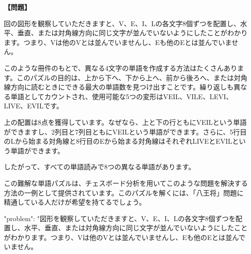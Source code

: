 \documentclass[10pt,a4paper,oneside,openany]{ltjsbook}
\begin{document}
\begin{tcolorbox}[colback=softblue,colframe=primaryblue,title=\textbf{第 303 問：UNDER THE VEIL.},arc=2mm,boxrule=1pt,breakable]
\textbf{【問題】}\par\vspace{0.3em}
回の図形を観察していただきますと、V、E、I、Lの各文字8個ずつを配置し、水平、垂直、または対角線方向に同じ文字が並んでいないようにしたことがわかります。つまり、Vは他のVとは並んでいませんし、Eも他のEとは並んでいません。

このような冊件のもとで、異なる4文字の単語を作成する方法はたくさんあります。このパズルの目的は、上から下へ、下から上へ、前から後ろへ、または対角線方向に読むときにできる最大の単語数を見つけ出すことです。繰り返しも異なる単語としてカウントされ、使用可能な5つの変形はVEIL、VILE、LEVI、LIVE、EVILです。

上の配置は8点を獲得しています。なぜなら、上と下の行ともにVEILという単語ができますし、2列目と7列目ともにVEILという単語ができます。さらに、5行目のLから始まる対角線と8行目のEから始まる対角線はそれぞれLIVEとEVILという単語ができます。

したがって、すべての単語読みで8つの異なる単語があります。

この難解な単語パズルは、チェスボード分析を用いてこのような問題を解決する方法の一例として提供されています。このパズルを解くには、「八王将」問題に精通している人だけが希望を持てるでしょう。

{
  "problem": "図形を観察していただきますと、V、E、I、Lの各文字8個ずつを配置し、水平、垂直、または対角線方向に同じ文字が並んでいないようにしたことがわかります。つまり、Vは他のVとは並んでいませんし、Eも他のEとは並んでいません。




}
\end{tcolorbox}
\end{document}
